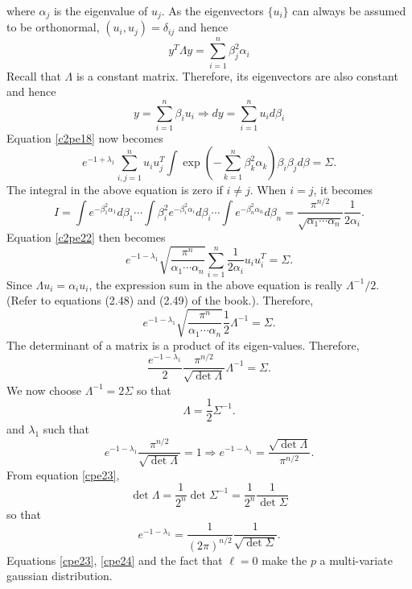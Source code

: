 \begin{enumerate}
\[\]
where $\alpha_j$ is the eigenvalue of $u_j$. As the eigenvectors $\{u_i\}$ can always be 
assumed to be orthonormal, $(u_i, u_j) = \delta_{ij}$ and hence
\[
y^T\Lambda y = \sum_{i=1}^n \beta_j^2\alpha_i
\]
Recall that $\Lambda$ is a constant matrix. Therefore, its eigenvectors are also constant and hence
\[
y = \sum_{i=1}^n\beta_i u_i \Rightarrow dy = \sum_{i=1}^n u_i d\beta_i
\]
Equation \eqref{c2pe18} now becomes
\begin{equation}\label{c2pe22}
e^{-1+\lambda_1}\sum_{i,j=1}^nu_iu_j^T\int \exp\left(-\sum_{k=1}^n\beta_k^2\alpha_k\right)\beta_i\beta_j d\beta = \Sigma.
\end{equation}
The integral in the above equation is zero if $i \ne j$. When $i = j$, it becomes
\[
I = \int e^{-\beta_1^2\alpha_1}d\beta_1 \cdots \int \beta_i^2e^{-\beta_i^2\alpha_i}d\beta_i \cdots \int e^{-\beta_n^2\alpha_n}d\beta_n = \frac{\pi^{n/2}}{\sqrt{\alpha_1 \cdots \alpha_n}}\frac{1}{2\alpha_i}.
\]
Equation \eqref{c2pe22} then becomes
\[
e^{-1-\lambda_1}\sqrt{\frac{\pi^n}{\alpha_1\cdots\alpha_n}}\sum_{i=1}^n \frac{1}{2\alpha_i}u_iu_i^T = \Sigma.
\]
Since $\Lambda u_i = \alpha_i u_i$, the expression sum in the above equation is really $\Lambda^{-1}/2$.
(Refer to equations (2.48) and (2.49) of the book.). Therefore,
\[
e^{-1 - \lambda_1}\sqrt{\frac{\pi^n}{\alpha_1\cdots\alpha_n}}\frac{1}{2}\Lambda^{-1} = \Sigma.
\]
The determinant of a matrix is a product of its eigen-values. Therefore,
\[
\frac{e^{-1 - \lambda_1}}{2}\frac{\pi^{n/2}}{\sqrt{\det\Lambda}}\Lambda^{-1} = \Sigma.
\]
We now choose $\Lambda^{-1} = 2\Sigma$ so that
\begin{equation}\label{cpe23}
\Lambda = \frac{1}{2}\Sigma^{-1}.
\end{equation}
and $\lambda_1$ such that 
\[
e^{-1 - \lambda_1}\frac{\pi^{n/2}}{\sqrt{\det\Lambda}} = 1 \Rightarrow e^{-1-\lambda_1} = \frac{\sqrt{\det\Lambda}}{\pi^{n/2}}.
\]
From equation \eqref{cpe23}, 
\[
\det\Lambda = \frac{1}{2^n}\det\Sigma^{-1} = \frac{1}{2^n}\frac{1}{\det\Sigma}
\]
so that
\begin{equation}\label{cpe24}
e^{-1 - \lambda_1} = \frac{1}{(2\pi)^{n/2}}\frac{1}{\sqrt{\det\Sigma}}.
\end{equation}
Equations \eqref{cpe23}, \eqref{cpe24} and the fact that $\ell = 0$ make the $p$ a multi-variate
gaussian distribution.
\end{enumerate}


